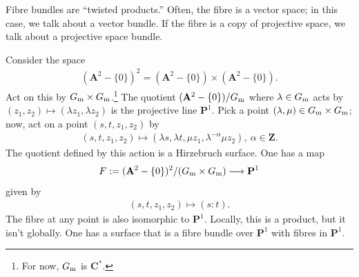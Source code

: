 \documentclass [11 pt, oneside] {article}
\begin{document}
Fibre bundles are ``twisted products.'' Often, the fibre is a vector space; in this case, we talk about a vector bundle. If the fibre is a copy of projective space, we talk about a projective space bundle.

\begin{example}\label{}
Consider the space
\begin{align*}
	(\mathbf{A}^2 - \{0\})^2 = (\mathbf{A}^2 - \{0\}) \times (\mathbf{A}^2 - \{0\}).
\end{align*}
Act on this by $G\textsubscript{m}\times G\textsubscript{m}$.\footnote{For now, $G\textsubscript{m}$ is $\mathbf{C}^*$.} The quotient $(\mathbf{A}^2 - \{0\})/G\textsubscript{m}$ where $\lambda \in G\textsubscript{m}$ acts by $(z_1,z_2)\longmapsto  (\lambda z_1,\lambda z_2)$ is the projective line $\mathbf{P}^1$. Pick a point $(\lambda,\mu)\in  G\textsubscript{m}\times G\textsubscript{m}$; now, act on a point $(s,t,z_1,z_2)$ by
\begin{align*}
	(s,t,z_1,z_2)\longmapsto  (\lambda s, \lambda t,\mu z_1,\lambda^{-\alpha}\mu z_2),\ \alpha\in  \mathbf{Z}.
\end{align*}
The quotient defined by this action is a Hirzebruch surface. One has a map
\begin{align*}
	F := (\mathbf{A}^2-\{0\})^2/({G\textsubscript{m}\times G\textsubscript{m}})\longrightarrow \mathbf{P}^1
\end{align*}
given by
\begin{align*}
	(s,t,z_1,z_2)\longmapsto  (s:t).
\end{align*}
The fibre at any point is also isomorphic to $\mathbf{P}^1$. Locally, this is a product, but it isn't globally. One has a surface that is a fibre bundle over $\mathbf{P}^1$ with fibres in $\mathbf{P}^1$.
\end{example}
\end{document}
